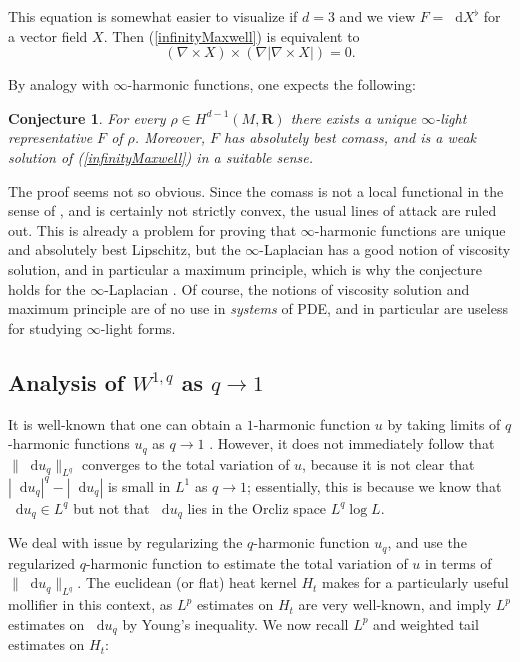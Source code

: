 \documentclass[reqno,11pt]{amsart}
\newcommand{\RR}{\mathbf{R}}
\newcommand*\dif{\mathop{}\!\mathrm{d}}
\newtheorem{conjecture}[theorem]{Conjecture}
\theoremstyle{definition}
\numberwithin{equation}{section}
\begin{document}
This equation is somewhat easier to visualize if $d = 3$ and we view $F = \dif X^\flat$ for a vector field $X$.
Then (\ref{infinityMaxwell}) is equivalent to 
$$(\nabla \times X) \times (\nabla |\nabla \times X|) = 0.$$

By analogy with $\infty$-harmonic functions, one expects the following:

\begin{conjecture}
For every $\rho \in H^{d - 1}(M, \RR)$ there exists a unique $\infty$-light representative $F$ of $\rho$.
Moreover, $F$ has absolutely best comass, and is a weak solution of (\ref{infinityMaxwell}) in a suitable sense.
\end{conjecture}

The proof seems not so obvious.
Since the comass is not a local functional in the sense of \cite{Crandall2008}, and is certainly not strictly convex, the usual lines of attack are ruled out.
This is already a problem for proving that $\infty$-harmonic functions are unique and absolutely best Lipschitz, but the $\infty$-Laplacian has a good notion of viscosity solution, and in particular a maximum principle, which is why the conjecture holds for the $\infty$-Laplacian \cite{Lindqvist14}.
Of course, the notions of viscosity solution and maximum principle are of no use in \emph{systems} of PDE, and in particular are useless for studying $\infty$-light forms.

\subsection{\texorpdfstring{Analysis of $W^{1, q}$ as $q \to 1$}{Analysis of Sobolev space as q approaches 1}}
It is well-known that one can obtain a $1$-harmonic function $u$ by taking limits of $q$-harmonic functions $u_q$ as $q \to 1$ \cite{Mazon14}.
However, it does not immediately follow that $\|\dif u_q\|_{L^q}$ converges to the total variation of $u$, because it is not clear that $|\dif u_q|^q - |\dif u_q|$ is small in $L^1$ as $q \to 1$; essentially, this is because we know that $\dif u_q \in L^q$ but not that $\dif u_q$ lies in the Orcliz space $L^q \log L$.

We deal with issue by regularizing the $q$-harmonic function $u_q$, and use the regularized $q$-harmonic function to estimate the total variation of $u$ in terms of $\|\dif u_q\|_{L^q}$.
The euclidean (or flat) heat kernel $H_t$ makes for a particularly useful mollifier in this context, as $L^p$ estimates on $H_t$ are very well-known, and imply $L^p$ estimates on $\dif u_q$ by Young's inequality.
We now recall $L^p$ and weighted tail estimates on $H_t$:
\end{document}
